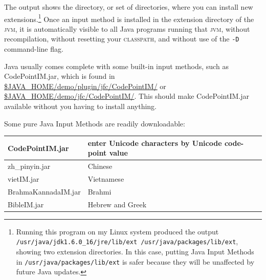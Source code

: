 \documentclass[letterpaper,12pt]{article}
\newcommand{\acro}{\textsc}
\begin{document}
\noindent
The output shows the directory, or set of directories, where you can
install new extensions.\footnote{Running this program on my Linux system
produced the output \texttt{/usr/java/jdk1.6.0\_16/jre/lib/ext
/usr/java/packages/lib/ext}, showing two extension directories.  In this
case, putting Java Input Methods in \texttt{/usr/java/packages/lib/ext}
is safer because they will be unaffected by future Java updates.} Once an
input method is installed in the extension directory of the \acro{jvm},
it is automatically visible to all Java programs running that \acro{jvm},
without recompilation, without resetting your \acro{classpath}, and
without use of the \verb!-D! command-line flag.  

Java usually comes complete with some built-in input methods, such as
CodePointIM.jar, which is found in
\url{$JAVA_HOME/demo/plugin/jfc/CodePointIM/} or
\url{$JAVA_HOME/demo/jfc/CodePointIM/}.  This should make CodePointIM.jar
available without you having to install anything. 

Some pure Java Input Methods are readily downloadable:

\vspace{.5cm}
\noindent
\begin{tabular}{|l|l|}
\hline
CodePointIM.jar     & enter Unicode characters by Unicode code-point value\footnotemark\\
\hline
zh\_pinyin.jar      & Chinese\footnotemark\\
\hline
vietIM.jar          & Vietnamese\footnotemark\\
\hline
BrahmaKannadaIM.jar & Brahmi\footnotemark\\
\hline
BibleIM.jar         & Hebrew and Greek\footnotemark\\
\hline
\end{tabular}
\vspace{.5cm}

\addtocounter{footnote}{-4}


\end{document}
